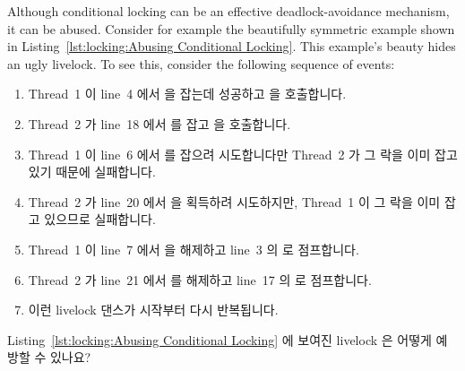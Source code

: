 Although conditional locking can be an effective deadlock-avoidance
mechanism, it can be abused.
Consider for example the beautifully symmetric example shown in
Listing~\ref{lst:locking:Abusing Conditional Locking}.
This example's beauty hides an ugly livelock.
To see this, consider the following sequence of events:
\fi

\begin{enumerate}
\item	Thread~1 이 line~4 에서  을 잡는데 성공하고
	 을 호출합니다.
\item	Thread~2 가 line~18 에서  를 잡고  을
	호출합니다.
\item	Thread~1 이 line~6 에서  를 잡으려 시도합니다만 Thread~2 가
	그 락을 이미 잡고 있기 때문에 실패합니다.
\item	Thread~2 가 line~20 에서  을 획득하려 시도하지만, Thread~1 이
	그 락을 이미 잡고 있으므로 실패합니다.
\item	Thread~1 이 line~7 에서  을 해제하고 line~3 의  로
	점프합니다.
\item	Thread~2 가 line~21 에서  를 해제하고 line~17 의 
	로 점프합니다.
\item	이런 livelock 댄스가 시작부터 다시 반복됩니다.

\end{enumerate}

\QuickQuiz{}
	Listing~\ref{lst:locking:Abusing Conditional Locking} 에 보여진 livelock
	은 어떻게 예방할 수 있나요?
	\iffalse

